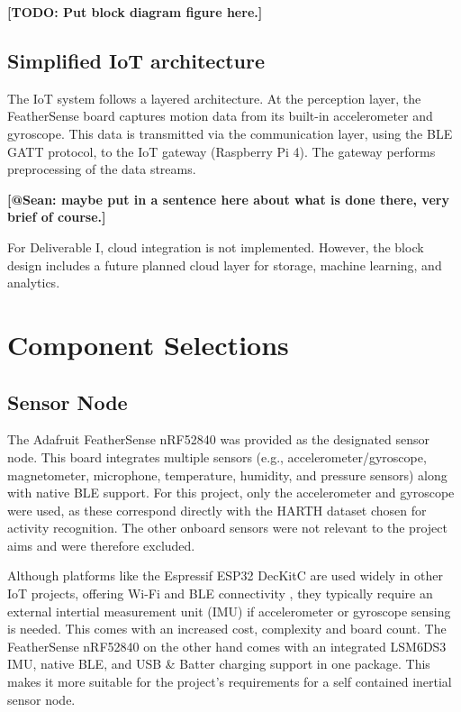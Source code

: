 \documentclass[conference]{lib/IEEEtran}
\begin{document}
\textbf{[TODO: Put block diagram figure here.]} 

\subsection{Simplified IoT architecture}

The IoT system follows a layered architecture. At the perception layer, the FeatherSense board captures motion data from its built-in accelerometer and gyroscope. This data is transmitted via the communication layer, using the BLE GATT protocol, to the IoT gateway (Raspberry Pi 4). The gateway performs preprocessing of the data streams. 

\textbf{[@Sean: maybe put in a sentence here about what is done there, very brief of course.]} 

For Deliverable I, cloud integration is not implemented. However, the block design includes a future planned cloud layer for storage, machine learning, and analytics.



\section{Component Selections}\label{CS}

\subsection{Sensor Node}\label{SN}
The Adafruit FeatherSense nRF52840\cite{b7} was provided as the designated sensor node. This board integrates multiple sensors (e.g., accelerometer/gyroscope, magnetometer, microphone, temperature, humidity, and pressure sensors) along with native BLE support. For this project, only the accelerometer and gyroscope were used, as these correspond directly with the HARTH dataset \cite{b5,b6} chosen for activity recognition. The other onboard sensors were not relevant to the project aims and were therefore excluded.

Although platforms like the Espressif ESP32 DecKitC are used widely in other IoT projects, offering Wi-Fi and BLE connectivity \cite{b8}, they typically require an external intertial measurement unit (IMU) if accelerometer or gyroscope sensing is needed. This comes with an increased cost, complexity and board count. The FeatherSense nRF52840 on the other hand comes with an integrated LSM6DS3 IMU, native BLE, and USB \& Batter charging support in one package. This makes it more suitable for the project's requirements for a self contained inertial sensor node.
\end{document}
